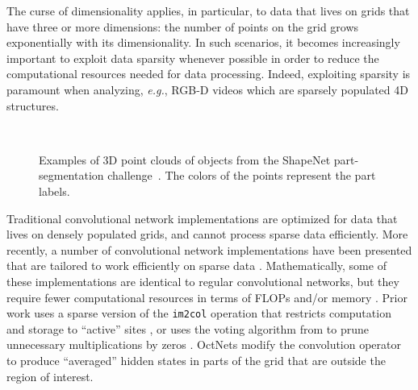 \documentclass[10pt,twocolumn,letterpaper]{article}
\begin{document}
The curse of dimensionality applies, in particular,
to data that lives on grids that have three or more dimensions: the number of points on the grid grows exponentially with its dimensionality. In such scenarios, it becomes increasingly important to exploit data sparsity whenever possible in order to reduce the computational resources needed for data processing. Indeed, exploiting sparsity is paramount when analyzing, \emph{e.g.}, RGB-D videos which are sparsely populated 4D structures.

\begin{figure}[t!]
    \centering
    \\
    \caption{Examples of 3D point clouds of objects from the ShapeNet part-segmentation challenge~\cite{yi2017large}. The colors of the points represent the part labels.}
    \label{fig:data}
\end{figure}

Traditional convolutional network implementations are optimized for data that lives on densely populated grids, and cannot process
sparse data efficiently. More recently, a number of convolutional network implementations have been presented that are tailored to work efficiently on sparse data \cite{graham2015sparse,riegler2016octnet,engelcke2017vote3deep}.
Mathematically, some of these implementations are identical to regular convolutional networks, but they require fewer computational resources in terms of FLOPs and/or memory \cite{graham2015sparse,engelcke2017vote3deep}. Prior work uses a sparse version of the \texttt{im2col} operation that restricts computation and storage to ``active'' sites \cite{graham2015sparse}, or uses the voting algorithm from \cite{wang2015voting} to prune unnecessary multiplications by zeros \cite{engelcke2017vote3deep}. OctNets \cite{riegler2016octnet} modify the convolution operator to produce ``averaged'' hidden states in parts of the grid that are outside the region of interest.
\end{document}
